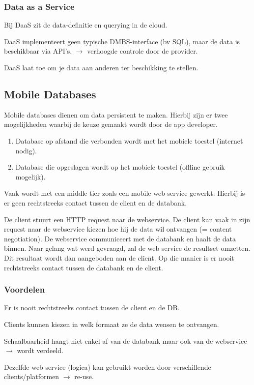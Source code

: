 \documentclass[a4paper,12pt]{article}
\begin{document}
\subsubsection{Data as a Service}
Bij DaaS zit de data-definitie en querying in de cloud.

DaaS implementeert geen typische DMBS-interface (bv SQL), maar de data is beschikbaar via API's. $\rightarrow$ verhoogde controle door de provider.

DaaS laat toe om je data aan anderen ter beschikking te stellen.

\subsection{Mobile Databases}
Mobile databases dienen om data persistent te maken.
Hierbij zijn er twee mogelijkheden waarbij de keuze gemaakt wordt door de app developer.
\begin{enumerate}
\item Database op afstand die verbonden wordt met het mobiele toestel (internet nodig).
\item Database die opgeslagen wordt op het mobiele toestel (offline gebruik mogelijk).
\end{enumerate}

Vaak wordt met een middle tier zoals een mobile web service gewerkt.
Hierbij is er geen rechtstreeks contact tussen de client en de databank.

De client stuurt een HTTP request naar de webservice.
De client kan vaak in zijn request naar de webservice kiezen hoe hij de data wil ontvangen (= content negotiation).
De webservice communiceert met de databank en haalt de data binnen.
Naar gelang wat werd gevraagd, zal de web service de resultset omzetten.
Dit resultaat wordt dan aangeboden aan de client.
Op die manier is er nooit rechtstreeks contact tussen de databank en de client.

\subsubsection{Voordelen}
Er is nooit rechtstreeks contact tussen de client en de DB.

Clients kunnen kiezen in welk formaat ze de data wensen te ontvangen.

Schaalbaarheid hangt niet enkel af van de databank maar ook van de webservice $\rightarrow$ wordt verdeeld.

Dezelfde web service (logica) kan gebruikt worden door verschillende clients/platformen $\rightarrow$ re-use.
\end{document}
